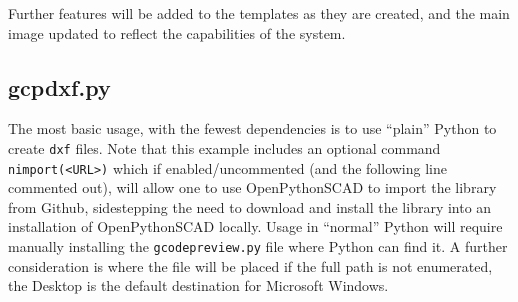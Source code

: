 \documentclass{ltxdoc}
\begin{document}
Further features will be added to the templates as they are created, and the main image updated to reflect the capabilities of the system.

%
%
%
%
%

\subsection{gcpdxf.py}

The most basic usage, with the fewest dependencies is to use ``plain'' Python to create \verb|dxf| files. Note that this example includes an optional command \verb|nimport(<URL>)| which if enabled/uncommented (and the following line commented out), will allow one to use OpenPythonSCAD to import the library from Github, sidestepping the need to download and install the library into an installation of OpenPythonSCAD locally. Usage in  ``normal'' Python will require manually installing the \verb|gcodepreview.py| file where Python can find it. A further consideration is where the file will be placed if the full path is not enumerated, the Desktop is the default destination for Microsoft Windows.
\end{document}
